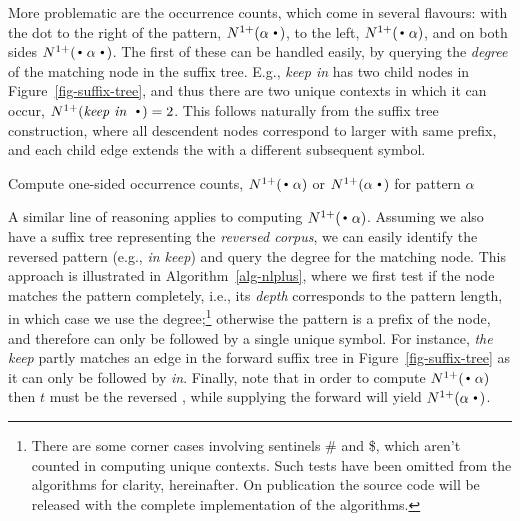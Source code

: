 More problematic are the occurrence counts, which come in several
flavours: with the dot to the right of the pattern, $\nlplus{\patdot}$,
to the left,  $\nlplus{\dotpat}$, and on both sides
$\nlplus{\dotpatdot}$. The first of these can be handled easily, by
querying the \emph{degree} of the matching node in the suffix tree. E.g., 
\emph{keep in} has two child nodes in  Figure~\ref{fig-suffix-tree},  
and thus there are two unique contexts in
which it can occur, $\nlplus{\emph{keep in~}\Bigcdot}=2$. This follows naturally from the suffix tree
construction, where all descendent nodes correspond to larger \ngrams with
same prefix, and each child edge extends the \ngram with a different
subsequent symbol. 
%
\begin{algorithm}[t]
  \caption{Compute one-sided occurrence counts, $\nlplus{\dotpat}$ or $\nlplus{\patdot}$ for pattern $\alpha$ 
    \label{alg:n1plus}}
  \begin{algorithmic}[1]
        \Else
        \EndIf
      \State {}
    \EndFunction
  \end{algorithmic}
\label{alg-nlplus}
\end{algorithm}
%
A similar line of reasoning applies to computing
$\nlplus{\dotpat}$. Assuming we also have a suffix tree representing
the \emph{reversed corpus}, we can easily identify the reversed pattern
(e.g., \emph{in keep}) and query the degree for the matching node. This
approach is illustrated in Algorithm~\ref{alg-nlplus}, where we first
test if the node matches the pattern completely, i.e., its
\emph{depth} corresponds to the pattern length, in which case we use
the degree;\footnote{There are some corner cases involving sentinels \#
  and \$, which aren't counted in computing unique contexts.
  Such tests have been omitted from the algorithms for clarity, hereinafter. On publication the
  source code will be released with the complete implementation of the
  algorithms.}
otherwise the pattern is a prefix of the node, and
therefore can only be followed by a single unique symbol. 
For instance, \emph{the keep} partly matches an edge in the forward suffix tree in
Figure~\ref{fig-suffix-tree} as it can only be followed by \emph{in}.
Finally, note that in order to compute $\nlplus{\dotpat}$ then $t$ must be the reversed \CST,
while supplying the forward \CST will yield $\nlplus{\patdot}$. 

